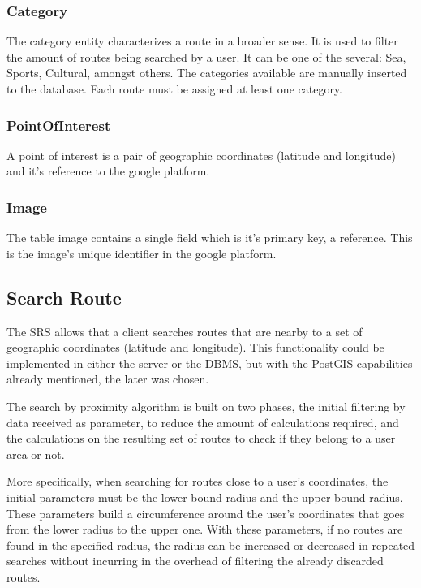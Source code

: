         \subsubsection*{Category}
        The category entity characterizes a route in a broader sense. It is used to filter the amount of routes being 
        searched by a user. It can be one of the several: Sea, Sports, Cultural, amongst others. The categories available
        are manually inserted to the database. Each route must be assigned at least one category.

        \subsubsection*{PointOfInterest}
        A point of interest is a pair of geographic coordinates (latitude and longitude) and it's reference to the google platform.

        \subsubsection*{Image}
        The table image contains a single field which is it's primary key, a reference. This is the image's unique identifier in the google
        platform.

    \subsection{Search Route}
    The SRS allows that a client searches routes that are nearby to a set of geographic coordinates (latitude and longitude). 
    This functionality could be implemented in either the server or the DBMS, but with the PostGIS capabilities already mentioned, the later was chosen.
    
    The search by proximity algorithm is built on two phases, the initial filtering by data received as parameter, to reduce the amount of 
    calculations required, and the calculations on the resulting set of routes to check if they belong to a user area or not.
    
    More specifically, when searching for routes close to a user's coordinates, the initial parameters must be the lower bound radius
    and the upper bound radius. These parameters build a circumference around the user's coordinates that goes from the lower radius to the 
    upper one. With these parameters, if no routes are found in the specified radius, the radius can be increased or decreased in repeated
    searches without incurring in the overhead of filtering the already discarded routes. 

